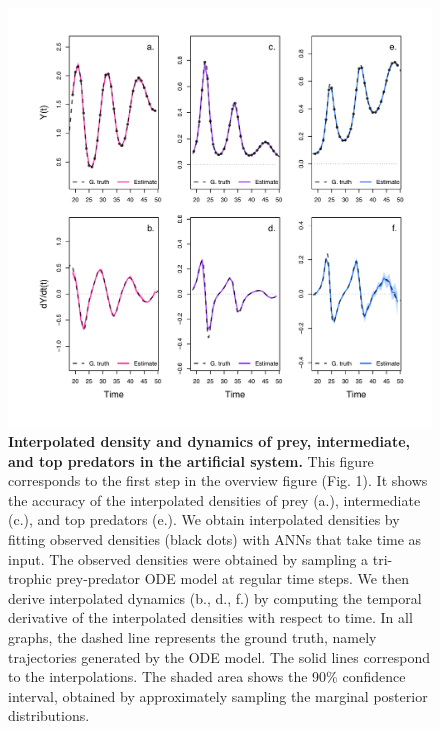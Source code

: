 \documentclass[11pt, oneside]{article}
\begin{document}
\newpage
\begin{figure}[H]
\begin{center}
\includegraphics[width=\linewidth]{figure_2.png}
\caption{
    \textbf{Interpolated density and dynamics of prey, intermediate, and top predators in the artificial system.}
    This figure corresponds to the first step in the overview figure (Fig. 1).
    It shows the accuracy of the interpolated densities of prey (a.), intermediate (c.), and top predators (e.).
    We obtain interpolated densities by fitting observed densities (black dots) with ANNs that take time as input.
    The observed densities were obtained by sampling a tri-trophic prey-predator ODE model at regular time steps.
    We then derive interpolated dynamics (b., d., f.) by computing the temporal derivative of the interpolated densities with respect to time.
    In all graphs, the dashed line represents the ground truth, namely trajectories generated by the ODE model.
    The solid lines correspond to the interpolations. 
    The shaded area shows the 90\% confidence interval, obtained by approximately sampling the marginal posterior distributions. 
}
\end{center}
\end{figure}
\newpage
\end{document}
